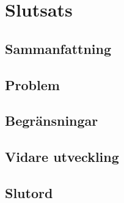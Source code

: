 \documentclass{kaumasters} %
\begin{document}
\newpage

\chapter{Slutsats}
\section{Sammanfattning}
\section{Problem}
\section{Begränsningar}
\section{Vidare utveckling}
\section{Slutord}



 



\restoregeometry%
\end{document}
